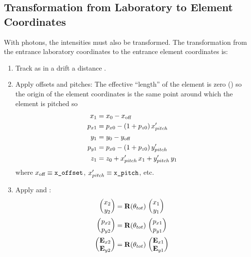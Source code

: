 \subsection{Transformation from Laboratory to Element Coordinates}
\label{s:crystal.trans.le}

With photons, the intensities must also be transformed.  The transformation from the entrance
laboratory coordinates to the entrance element coordinates is:
\begin{enumerate}
\item
Track as in a drift a distance .
\item
{}
Apply offsets and pitches: The effective ``length'' of the element is zero ()
so the origin of the element coordinates is the same point around which the element is pitched so
\begin{align}
  x_1    &= x_0 - x_{\text{off}} \nonumber \\
  p_{x1} &= p_{x0} - (1 + p_{z0}) \, x'_{pitch} \nonumber \\
  y_1    &= y_0 - y_{\text{off}} \\
  p_{y1} &= p_{x0} - (1 + p_{z0}) \, y'_{pitch} \nonumber \\
  z_1    &= z_0 + x'_{pitch} \, x_1 + y'_{pitch} \, y_1 \nonumber
\end{align}
where $x_{\text{off}} \equiv \vn{x_offset}$, $x'_{pitch} \equiv \vn{x_pitch}$, etc.
\item
Apply  and :
\begin{align}
  \begin{pmatrix} x_2 \\ y_2 \end{pmatrix} &=
    \bfR (\theta_{tot}) \,   
  \begin{pmatrix} x_1 \\ y_1 \end{pmatrix} \CRNO
  \begin{pmatrix} p_{x2} \\ p_{y2} \end{pmatrix} &=
    \bfR (\theta_{tot}) \, 
  \begin{pmatrix} p_{x1} \\ p_{y1} \end{pmatrix} \label{xyrtxy} \\ 
  \begin{pmatrix} \bfE_{x2} \\ \bfE_{y2} \end{pmatrix} &=
    \bfR (\theta_{tot}) \,   \begin{pmatrix} \bfE_{x1} \\ \bfE_{y1} \end{pmatrix} \nonumber

\end{align}
\end{enumerate}
